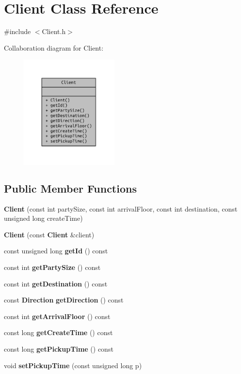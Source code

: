 \section{Client Class Reference}
\label{class_client}


{\ttfamily \#include $<$Client.\+h$>$}



Collaboration diagram for Client\+:\nopagebreak
\begin{figure}[H]
\begin{center}
\leavevmode
\includegraphics[width=141pt]{class_client__coll__graph}
\end{center}
\end{figure}
\subsection*{Public Member Functions}
\begin{DoxyCompactItemize}
\item 
{\bf Client} (const int party\+Size, const int arrival\+Floor, const int destination, const unsigned long create\+Time)
\item 
{\bf Client} (const {\bf Client} \&client)
\item 
const unsigned long {\bf get\+Id} () const 
\item 
const int {\bf get\+Party\+Size} () const 
\item 
const int {\bf get\+Destination} () const 
\item 
const {\bf Direction} {\bf get\+Direction} () const 
\item 
const int {\bf get\+Arrival\+Floor} () const 
\item 
const long {\bf get\+Create\+Time} () const 
\item 
const long {\bf get\+Pickup\+Time} () const 
\item 
void {\bf set\+Pickup\+Time} (const unsigned long p)
\end{DoxyCompactItemize}
